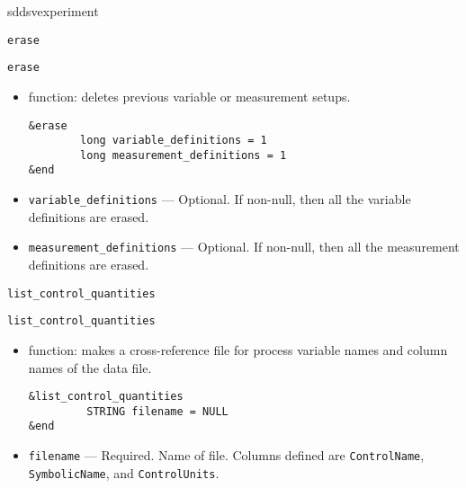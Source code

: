 \begin{sddsprog}{sddsvexperiment}
\begin{itemize}
\begin{latexonly}
\newpage\begin{center}{\Large \verb+erase+}\end{center}
\end{latexonly}
\begin{htmlonly}
  \item {\Large \verb+erase+}
\end{htmlonly}
  \begin{itemize}
    \item function: deletes previous variable or measurement setups.
\begin{verbatim}
&erase
        long variable_definitions = 1
        long measurement_definitions = 1
&end
\end{verbatim}
    \item {\verb+variable_definitions+} --- Optional. If non-null, then all the variable definitions are erased.
    \item {\verb+measurement_definitions+} --- Optional. If non-null, then all the measurement definitions are erased.
  \end{itemize}

\begin{latexonly}
\begin{center}{\Large \verb+list_control_quantities+}\end{center}
\end{latexonly}
\begin{htmlonly}
  \item {\Large \verb+list_control_quantities+}
\end{htmlonly}
  \begin{itemize}
    \item function: makes a cross-reference file for process variable names and column names of the data file.
\begin{verbatim}
&list_control_quantities
         STRING filename = NULL
&end
\end{verbatim}
    \item {\verb+filename+} --- Required. Name of file. Columns defined are \verb+ControlName+,
                \verb+SymbolicName+, and \verb+ControlUnits+.
  \end{itemize}


\end{itemize}
\end{sddsprog}
